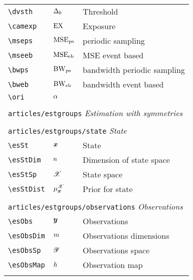 \begin{longtable}{lll}
 {\color[rgb]{0.5,0.5,0.5}\texttt{\textbackslash dvsth}} & $\Delta_b$ &  Threshold\\ 
 {\color[rgb]{0.5,0.5,0.5}\texttt{\textbackslash camexp}} & $\text{EX}$ &  Exposure\\ 
 {\color[rgb]{0.5,0.5,0.5}\texttt{\textbackslash mseps}} & $\text{MSE}_{\text{ps}}$ &  periodic sampling\\ 
 {\color[rgb]{0.5,0.5,0.5}\texttt{\textbackslash mseeb}} & $\text{MSE}_{\text{eb}}$ &  MSE event based\\ 
 {\color[rgb]{0.5,0.5,0.5}\texttt{\textbackslash bwps}} & $\text{BW}_{\text{ps}}$ &  bandwidth periodic sampling\\ 
 {\color[rgb]{0.5,0.5,0.5}\texttt{\textbackslash bweb}} & $\text{BW}_{\text{eb}}$ &  bandwidth event based\\ 
 {\color[rgb]{0.5,0.5,0.5}\texttt{\textbackslash ori}} & $\alpha$ & \\ 
  &  & \\ 
 \multicolumn{3}{l}{{\color[rgb]{0.5,0.5,0.5}\texttt{articles/estgroups}} \emph{Estimation with symmetries}}\\ 
 \hline
 &  & \\ 
 \multicolumn{3}{l}{{\color[rgb]{0.5,0.5,0.5}\texttt{articles/estgroups/state}} \emph{State}}\\ 
 \hline
{\color[rgb]{0.5,0.5,0.5}\texttt{\textbackslash esSt}} & $\boldsymbol{x}$ &  State\\ 
 {\color[rgb]{0.5,0.5,0.5}\texttt{\textbackslash esStDim}} & $n$ &  Dimension of state space\\ 
 {\color[rgb]{0.5,0.5,0.5}\texttt{\textbackslash esStSp}} & $\mathscr{X}$ &  State space\\ 
 {\color[rgb]{0.5,0.5,0.5}\texttt{\textbackslash esStDist}} & $\mu^{\mathscr{X}}_{\boldsymbol{x}}$ &  Prior for state\\ 
  &  & \\ 
 \multicolumn{3}{l}{{\color[rgb]{0.5,0.5,0.5}\texttt{articles/estgroups/observations}} \emph{Observations}}\\ 
 \hline
{\color[rgb]{0.5,0.5,0.5}\texttt{\textbackslash esObs}} & $\boldsymbol{y}$ &  Observations\\ 
 {\color[rgb]{0.5,0.5,0.5}\texttt{\textbackslash esObsDim}} & $m$ &  Observations dimensions\\ 
 {\color[rgb]{0.5,0.5,0.5}\texttt{\textbackslash esObsSp}} & $\mathscr{Y}$ &  Observations space\\ 
 {\color[rgb]{0.5,0.5,0.5}\texttt{\textbackslash esObsMap}} & $h$ &  Observation map\\ 
  &  & {\setlength\fboxsep{1pt}%
}
\end{longtable}
